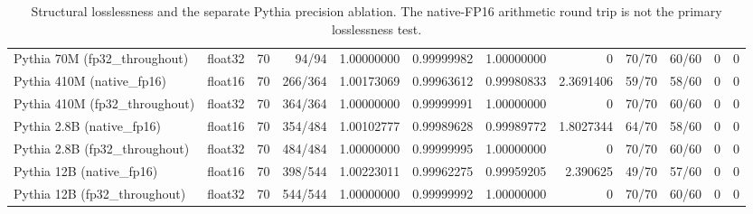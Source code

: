 \begin{table}[t]
\begin{tabular}{llrrrrrrrrrr}
Pythia 70M (fp32_throughout) & float32 & 70 & 94/94 & 1.00000000 & 0.99999982 & 1.00000000 & 0 & 70/70 & 60/60 & 0 & 0 \\
Pythia 410M (native_fp16) & float16 & 70 & 266/364 & 1.00173069 & 0.99963612 & 0.99980833 & 2.3691406 & 59/70 & 58/60 & 0 & 0 \\
Pythia 410M (fp32_throughout) & float32 & 70 & 364/364 & 1.00000000 & 0.99999991 & 1.00000000 & 0 & 70/70 & 60/60 & 0 & 0 \\
Pythia 2.8B (native_fp16) & float16 & 70 & 354/484 & 1.00102777 & 0.99989628 & 0.99989772 & 1.8027344 & 64/70 & 58/60 & 0 & 0 \\
Pythia 2.8B (fp32_throughout) & float32 & 70 & 484/484 & 1.00000000 & 0.99999995 & 1.00000000 & 0 & 70/70 & 60/60 & 0 & 0 \\
Pythia 12B (native_fp16) & float16 & 70 & 398/544 & 1.00223011 & 0.99962275 & 0.99959205 & 2.390625 & 49/70 & 57/60 & 0 & 0 \\
Pythia 12B (fp32_throughout) & float32 & 70 & 544/544 & 1.00000000 & 0.99999992 & 1.00000000 & 0 & 70/70 & 60/60 & 0 & 0 \\
\bottomrule
\end{tabular}
\caption{Structural losslessness and the separate Pythia precision ablation. The native-FP16 arithmetic round trip is not the primary losslessness test.}
\label{tab:behavioral-methodology}
\end{table}
